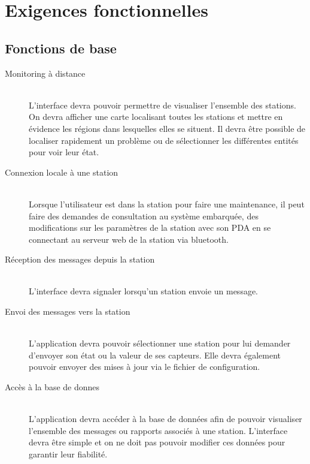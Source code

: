 
\section{Exigences fonctionnelles}

\subsection{Fonctions de base}

\begin{description}
	\item[ Monitoring à distance]\hfill\\
		L'interface devra pouvoir permettre de visualiser l'ensemble des stations. On devra afficher une carte localisant toutes les stations et mettre en évidence les régions dans lesquelles elles se situent. Il devra être possible de localiser rapidement un problème ou de sélectionner les différentes entités pour voir leur état.\\
		
	\item[Connexion locale à une station]\hfill\\
	 	Lorsque l'utilisateur est dans la station pour faire une maintenance, il peut faire des demandes de consultation au système embarquée, des modifications sur les paramètres de la station avec son PDA en se connectant au serveur web de la station via bluetooth. 
		
	\item [Réception des messages depuis la station]\hfill\\
		L'interface devra signaler lorsqu'un station envoie un message. \\

	\item [Envoi des messages vers la station]\hfill\\
		L'application devra pouvoir sélectionner une station pour lui demander d'envoyer son état ou la valeur de ses capteurs. Elle devra également pouvoir envoyer des mises à jour via le fichier de configuration.\\

	\item [Accès à la base de donnes]\hfill\\
		L'application devra accéder à la base de données afin de pouvoir visualiser l'ensemble des messages ou rapports associés à une station. L'interface devra être simple et on ne doit pas pouvoir modifier ces données pour garantir leur fiabilité.
\end{description}


